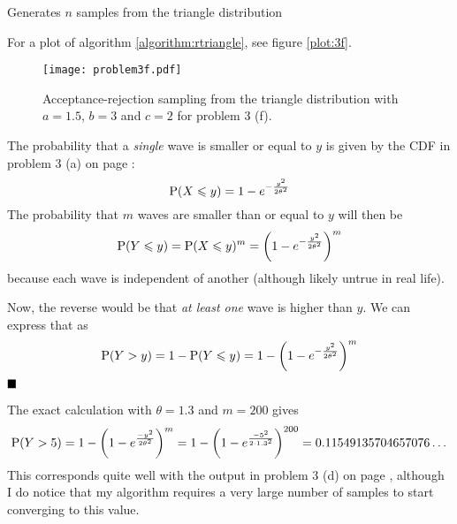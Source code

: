\documentclass[a4paper,english,12pt]{article}
\begin{document}
\begin{algorithm}
  \caption{Generates $n$ samples from the triangle distribution}
  \label{algorithm:rtriangle}
  \begin{algorithmic}[1]
        \State {}
      \Else
        \State {}
      \EndIf
    \EndFunction
        \Repeat
           
      \EndFor
      \State {}
    \EndFunction
  \end{algorithmic}
\end{algorithm}

For a plot of algorithm \vref{algorithm:rtriangle}, see figure \vref{plot:3f}.

\begin{figure}
  \centering
  \texttt{[image: problem3f.pdf]}
  \caption{Acceptance-rejection sampling from the triangle distribution with
  $a=1.5$, $b=3$ and $c=2$ for problem 3 (f).}
  \label{plot:3f}
\end{figure}

The probability that a \textit{single} wave is smaller or equal to $y$ is given
by the CDF in problem 3 (a) on page \pageref{problem:3a}:
\[
  \mathrm{P}(X\leqslant y) = 1 - e^{-\frac{y^2}{2\theta^2}}
\]
The probability that $m$ waves are smaller than or equal to $y$ will then be
\[
  \mathrm{P}(Y \leqslant y)
    = \mathrm{P}(X\leqslant y)^m
    = \left( 1 - e^{-\frac{y^2}{2\theta^2}} \right)^m
\]
because each wave is independent of another (although likely untrue in real
life).

Now, the reverse would be that \textit{at least one} wave is higher than $y$.
We can express that as
\[
  \mathrm{P}(Y > y)
    = 1 - \mathrm{P}(Y \leqslant y)
    = 1 - \left(1 - e^{-\frac{y^2}{2\theta^2}} \right)^m
\]
$\hfill\blacksquare$

The exact calculation with $\theta=1.3$ and $m=200$ gives
\[
  \mathrm{P}(Y>5)
    = 1 - \left(1 - e^{\frac{-y^2}{2\theta^2}} \right)^m
    = 1 - \left(1 - e^{\frac{-5^2}{2\cdot1.3^2}} \right)^{200}
    = 0.11549135704657076\dots
\]
This corresponds quite well with the output in problem 3 (d) on page
\pageref{problem:3d}, although I do notice that my algorithm requires a very
large number of samples to start converging to this value.
\end{document}
